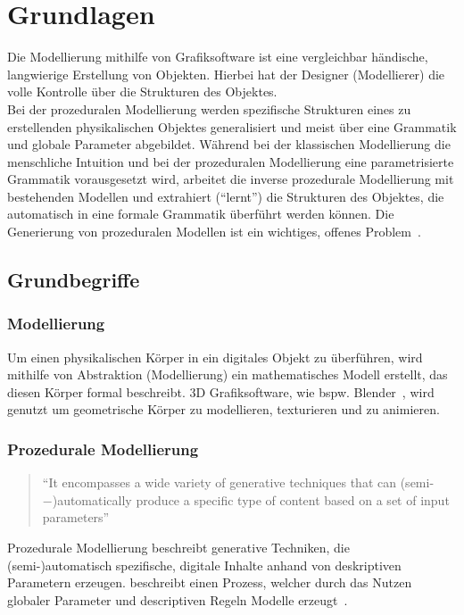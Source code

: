 
\chapter{Grundlagen}

Die Modellierung mithilfe von Grafiksoftware ist eine vergleichbar händische, langwierige Erstellung von
Objekten.
Hierbei hat der Designer (Modellierer) die volle Kontrolle über die Strukturen des Objektes.\\
Bei der prozeduralen Modellierung werden spezifische Strukturen eines zu erstellenden physikalischen Objektes
generalisiert und meist über eine Grammatik und globale Parameter abgebildet.
Während bei der klassischen Modellierung die menschliche Intuition und bei der prozeduralen Modellierung eine
parametrisierte Grammatik vorausgesetzt wird, arbeitet die inverse prozedurale Modellierung mit bestehenden Modellen und
extrahiert ("`lernt"') die Strukturen des Objektes, die automatisch in eine formale Grammatik überführt werden können.
Die Generierung von prozeduralen Modellen ist ein wichtiges, offenes Problem~\cite{benes_2011}.

\section{Grundbegriffe}

\subsection*{Modellierung}
Um einen physikalischen Körper in ein digitales Objekt zu überführen, wird mithilfe von Abstraktion (Modellierung)
ein mathematisches Modell erstellt, das diesen Körper formal beschreibt.
3D Grafiksoftware, wie bspw. Blender~\cite{blender}, wird genutzt um geometrische Körper zu modellieren, texturieren
und zu animieren.

\newpage

\subsection*{Prozedurale Modellierung}
\begin{quote}
    "`It encompasses a wide variety of generative techniques that
    can (semi-−)automatically produce a specific type of content based on a set of input
    parameters"'~\cite{smelik_2014}
\end{quote}
Prozedurale Modellierung beschreibt generative Techniken, die \\(semi-)automatisch spezifische, digitale
Inhalte anhand von deskriptiven Parametern erzeugen.
\citeauthor{smelik_2014} beschreibt einen Prozess, welcher durch das Nutzen globaler Parameter und descriptiven Regeln
Modelle erzeugt~\cite{smelik_2014}.
